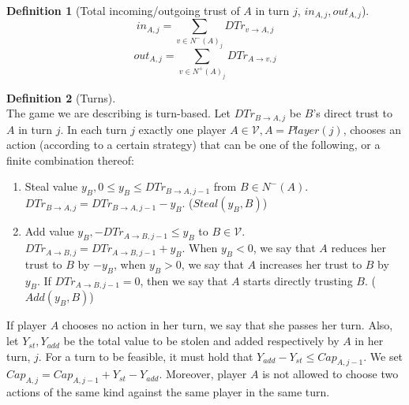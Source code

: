 \documentclass[11pt]{article}
\theoremstyle{definition}
\newtheorem{definition}{Definition}[section]
\theoremstyle{corollary}
\theoremstyle{lemma}
\begin{document}
      \begin{definition}[Total incoming/outgoing trust of $A$ in turn $j$, $in_{A, j}, out_{A, j}$] \ \\
         $$in_{A, j} = \sum\limits_{v \in N^{-}(A)_j}DTr_{v \rightarrow A, j}$$
         $$out_{A, j} = \sum\limits_{v \in N^{+}(A)_j}DTr_{A \rightarrow v, j}$$
      \end{definition}
      \begin{definition}[Turns] \ \\
         The game we are describing is turn-based. Let $DTr_{B \rightarrow A, j}$ be $B$'s direct trust to $A$ in turn $j$.
         In each turn $j$ exactly one player $A \in \mathcal{V}, A = Player(j)$, chooses an action (according to a certain
         strategy) that can be one of the following, or a finite combination thereof:
         \begin{enumerate}
            \item Steal value $y_B, 0 \leq y_B \leq DTr_{B \rightarrow A, j-1}$ from $B \in N^{-}(A)$.
            $DTr_{B \rightarrow A, j} = DTr_{B \rightarrow A, j-1} - y_B$. ($Steal(y_B, B)$)
            \item Add value $y_B, -DTr_{A \rightarrow B, j-1} \leq y_B$ to $B \in \mathcal{V}$.
            $DTr_{A \rightarrow B, j} = DTr_{A \rightarrow B, j-1} + y_B$. When $y_B < 0$, we say that $A$ reduces her trust
            to $B$ by $-y_B$, when $y_B > 0$, we say that $A$ increases her trust to $B$ by $y_B$.
            If $DTr_{A \rightarrow B, j-1} = 0$, then we say that $A$ starts directly trusting $B$. ($Add(y_B, B)$)
         \end{enumerate}
         If player $A$ chooses no action in her turn, we say that she passes her turn. Also, let $Y_{st}, Y_{add}$ be the
         total value to be stolen and added respectively by $A$ in her turn, $j$. For a turn to be feasible, it must hold
         that $Y_{add} - Y_{st} \leq Cap_{A, j-1}$. We set $Cap_{A, j} = Cap_{A, j-1} + Y_{st} - Y_{add}$. Moreover, player
         $A$ is not allowed to choose two actions of the same kind against the same player in the same turn. \\

\end{definition}
\end{document}

